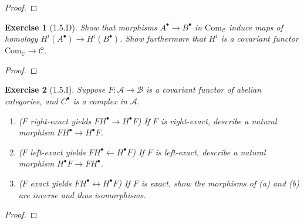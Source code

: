 \documentclass{amsart}
\newtheorem*{exercise*}{Exercise}
\begin{document}
\vspace{0.1in}

\begin{proof}
	
\end{proof}

\vspace{0.1in}


\begin{exercise*}[1.5.D]
    Show that morphisms $A^\bullet\rightarrow B^\bullet$ in $\mathrm{Com}_{\mathscr{C}}$ induce maps of homology $H^i(A^\bullet)\rightarrow H^i(B^\bullet)$. Show furthermore that $H^i$ is a covariant functor $\mathrm{Com}_{\mathscr{C}}\rightarrow \mathscr{C}$.
\end{exercise*}

\vspace{0.1in}

\begin{proof}
	
\end{proof}

\vspace{0.1in}


\begin{exercise*}[1.5.I]
    Suppose $F:\mathscr{A}\rightarrow \mathscr{B}$ is a covariant functor of abelian categories, and $C^\bullet$ is a complex in $\mathscr{A}$. 
    \begin{enumerate}
        \item[(a)] ($F$ right-exact yields $FH^\bullet\rightarrow H^\bullet F$) If $F$ is right-exact, describe a natural morphism $FH^\bullet\rightarrow H^\bullet F$. 
        \item[(b)] ($F$ left-exact yields $FH^\bullet\leftarrow H^\bullet F$) If $F$ is left-exact, describe a natural morphism $H^\bullet F\rightarrow FH^\bullet$. 
        \item[(c)]($F$ exact yields $FH^\bullet \leftrightarrow H^\bullet F$) If $F$ is exact, show the morphisms of (a) and (b) are inverse and thus isomorphisms. 
    \end{enumerate}
\end{exercise*}

\vspace{0.1in}

\begin{proof}
	
\end{proof}
\end{document}
